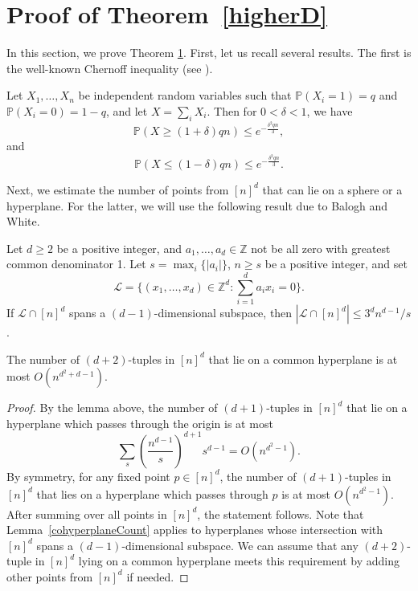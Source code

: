 \section{Proof of Theorem~\ref{higherD}} \label{proofhigherD}
%
In this section, we prove Theorem \ref{proofhigherD}.  First, let us recall several results.  The first is the well-known Chernoff inequality (see \cite[Theorem 2.8]{janson}).
%
%
\begin{lemma}\label{chernoff}
%
    Let $X_1,\ldots, X_n$ be independent random variables such that $\mathbb{P}(X_i = 1) = q$ and $\mathbb{P}(X_i = 0) = 1-q$, and let $X = \sum_i X_i$. Then for $0 < \delta < 1$, we have
%
$$\mathbb{P}(X \geq (1 + \delta)qn) \leq e^{-\frac{\delta^2qn}{3}},$$and
$$\mathbb{P}(X \leq (1 - \delta)qn) \leq e^{-\frac{\delta^2qn}{3}}.$$
%
%
%
\end{lemma}
%
%
%
%
%
%
Next, we estimate the number of points from $[n]^d$ that can lie on a sphere or a hyperplane.  For the latter, we will use the following result due to Balogh and White.
%
%
%
%
%
\begin{lemma}\label{hyperplaneBound} 
Let $d \geq 2$ be a positive integer, and $a_1,\ldots,a_d \in \mathbb{Z}$ not be all zero with greatest common denominator 1. Let $s = \max_i\{|a_i|\}$, $n \geq s$ be a positive integer, and set
\[ \mathcal{L} = \{ (x_1,\ldots,x_d) \in \mathbb{Z}^d \colon \sum_{i=1}^d a_ix_i = 0 \}.\]
If $\mathcal{L} \cap [n]^d$ spans a $(d-1)$-dimensional subspace, then $|\mathcal{L} \cap [n]^d| \leq 3^dn^{d-1}/s$. 
%
\end{lemma}
%
%
\begin{lemma}\label{cohyperplaneCount}
%
The number of $(d+2)$-tuples in $[n]^d$ that lie on a common hyperplane is at most $O(n^{d^2+d-1})$. 
%
\end{lemma}
%
\begin{proof} By the lemma above, the number of $(d+1)$-tuples in $[n]^d$ that lie on a hyperplane which passes through the origin is at most
%
    \[ \sum_s \left( \frac{n^{d-1}}{s} \right)^{d+1} s^{d-1} = O(n^{d^2 - 1}). \]
%
\noindent By symmetry, for any fixed point $p\in [n]^d$, the number of $(d+1)$-tuples in $[n]^d$ that lies on a hyperplane which passes through $p$ is at most  $O(n^{d^2 - 1}).$  After summing over all points in $[n]^d$, the statement follows. Note that Lemma~\ref{cohyperplaneCount} applies to hyperplanes whose intersection with $[n]^d$ spans a $(d-1)$-dimensional subspace. We can assume that any $(d+2)$-tuple in $[n]^d$ lying on a common hyperplane meets this requirement by adding other points from $[n]^d$ if needed.\end{proof} 
